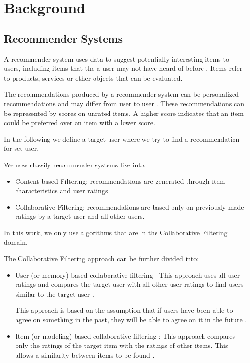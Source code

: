 \chapter{Background}

\section{Recommender Systems}

A recommender system uses data to suggest potentially interesting items to users, including items that the a user may not have heard of before \cite{LU20121}. Items refer to products, services or other objects that can be evaluated. 

The recommendations produced by a recommender system can be personalized recommendations and may differ from user to user \cite{LU20121}. These recommendations can be represented by scores on unrated items. A higher score indicates that an item could be preferred over an item with a lower score.

In the following we define a target user where we try to find a recommendation for set user.

We now classify recommender systems like \cite{LU20121, itemColFiltRecom} into:

\begin{itemize}
    \item Content-based Filtering: recommendations are generated through item characteristics and user ratings
    \item Collaborative Filtering: recommendations are based only on previously made ratings by a target user and all other users. 
\end{itemize}

In this work, we only use algorithms that are in the Collaborative Filtering domain. 

The Collaborative Filtering approach can be further divided into:

\begin{itemize}
    \item User (or memory) based collaborative filtering \cite{itemColFiltRecom, LU20121}: This approach uses all user ratings and compares the target user with all other user ratings to find users similar to the target user \cite{itemColFiltRecom}. 
    
    This approach is based on the assumption that if users have been able to agree on something in the past, they will be able to  agree on it in the future \cite{LU20121}.  

    
    \item Item (or modeling) based collaborative filtering \cite{itemColFiltRecom, LU20121}: This approach compares only the ratings of the target item with the ratings of other items. This allows a similarity between items to be found \cite{itemColFiltRecom}.
\end{itemize}

